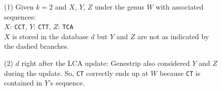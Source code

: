\documentclass[pdflatex,sn-vancouver-num]{sn-jnl}
\begin{document}
\begin{figure}[!htbp]%
\centering
\small
\begin{minipage}[c]{0.25\textwidth}
\begin{flushleft}(1) Given $k = 2$ and $X$, $Y$, $Z$ under the genus $W$ with associated sequences:\\
$X$: \texttt{CCT}, $Y$: \texttt{CTT}, $Z$: \texttt{TCA}\\
$X$ is stored in the database $d$ but $Y$ and $Z$ are not as indicated by the dashed branches.
\end{flushleft}
\end{minipage}
\begin{minipage}[c]{0.2\textwidth}
\end{minipage}
\begin{minipage}[c]{0.25\textwidth}
\begin{flushleft}(2) $d$ right after the LCA update: Genestrip also considered $Y$ and $Z$ during the update. So, \texttt{CT} correctly ends up at $W$ because \texttt{CT} is contained in $Y$'s sequence. 
\end{flushleft}
\end{minipage}
\begin{minipage}[c]{0.2\textwidth}
\end{minipage}

\vspace{0.2cm}


\end{figure}
\end{document}
